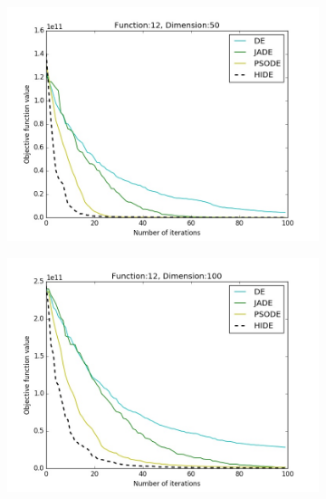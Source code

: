 \documentclass[a4paper,twoside]{article}
\begin{document}
\begin{figure}[t!]
    \begin{subfigure}[b]{0.24\textwidth}
        \includegraphics[width=\textwidth,natwidth=800,natheight=600]{plot_50D_F12_save}
        \caption{}
    \end{subfigure}
    \begin{subfigure}[b]{0.24\textwidth}
        \includegraphics[width=\textwidth,natwidth=800,natheight=600]{plot_100D_F12_save}
        \caption{}
    \end{subfigure}
    \begin{subfigure}[b]{0.24\textwidth}

\end{subfigure}
\end{figure}
\end{document}
